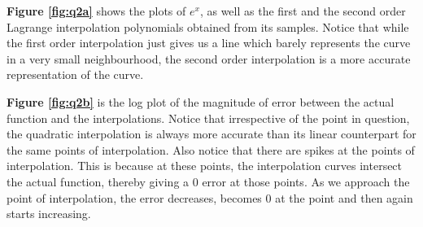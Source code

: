 \documentclass[12,a4paper]{article}
\begin{document}
    \textbf{Figure \ref{fig:q2a}} shows the plots of $e^x$, as well as the first and the second order Lagrange interpolation polynomials obtained from its samples. Notice that while the first order interpolation just gives us a line which barely represents the curve in a very small neighbourhood, the second order interpolation is a more accurate representation of the curve.
    
    \textbf{Figure \ref{fig:q2b}} is the log plot of the magnitude of error between the actual function and the interpolations. Notice that irrespective of the point in question, the quadratic interpolation is always more accurate than its linear counterpart for the same points of interpolation. Also notice that there are spikes at the points of interpolation. This is because at these points, the interpolation curves intersect the actual function, thereby giving a 0 error at those points. As we approach the point of interpolation, the error decreases, becomes 0 at the point and then again starts increasing.
    \newpage
\end{document}
